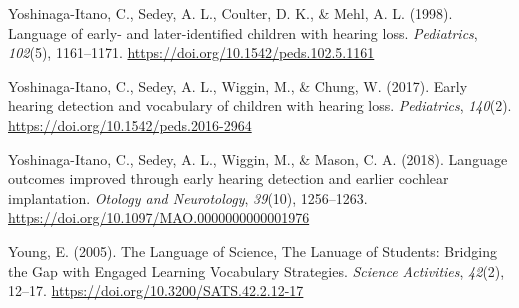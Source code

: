 \documentclass[english,man]{apa6}
\begin{document}
\leavevmode\hypertarget{ref-yoshinaga-itano1998}{}%
Yoshinaga-Itano, C., Sedey, A. L., Coulter, D. K., \& Mehl, A. L. (1998). Language of early- and later-identified children with hearing loss. \emph{Pediatrics}, \emph{102}(5), 1161--1171. \url{https://doi.org/10.1542/peds.102.5.1161}

\leavevmode\hypertarget{ref-yoshinaga-itano2017}{}%
Yoshinaga-Itano, C., Sedey, A. L., Wiggin, M., \& Chung, W. (2017). Early hearing detection and vocabulary of children with hearing loss. \emph{Pediatrics}, \emph{140}(2). \url{https://doi.org/10.1542/peds.2016-2964}

\leavevmode\hypertarget{ref-yoshinaga-itano2018}{}%
Yoshinaga-Itano, C., Sedey, A. L., Wiggin, M., \& Mason, C. A. (2018). Language outcomes improved through early hearing detection and earlier cochlear implantation. \emph{Otology and Neurotology}, \emph{39}(10), 1256--1263. \url{https://doi.org/10.1097/MAO.0000000000001976}

\leavevmode\hypertarget{ref-young2005}{}%
Young, E. (2005). The Language of Science, The Lanuage of Students: Bridging the Gap with Engaged Learning Vocabulary Strategies. \emph{Science Activities}, \emph{42}(2), 12--17. \url{https://doi.org/10.3200/SATS.42.2.12-17}
\end{document}

